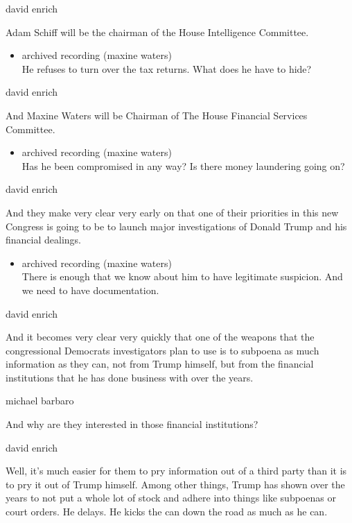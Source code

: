 david enrich

Adam Schiff will be the chairman of the House Intelligence Committee.

\begin{itemize}
\tightlist
\item
  archived recording (maxine waters)\\
  He refuses to turn over the tax returns. What does he have to hide?
\end{itemize}

david enrich

And Maxine Waters will be Chairman of The House Financial Services
Committee.

\begin{itemize}
\tightlist
\item
  archived recording (maxine waters)\\
  Has he been compromised in any way? Is there money laundering going
  on?
\end{itemize}

david enrich

And they make very clear very early on that one of their priorities in
this new Congress is going to be to launch major investigations of
Donald Trump and his financial dealings.

\begin{itemize}
\tightlist
\item
  archived recording (maxine waters)\\
  There is enough that we know about him to have legitimate suspicion.
  And we need to have documentation.
\end{itemize}

david enrich

And it becomes very clear very quickly that one of the weapons that the
congressional Democrats investigators plan to use is to subpoena as much
information as they can, not from Trump himself, but from the financial
institutions that he has done business with over the years.

michael barbaro

And why are they interested in those financial institutions?

david enrich

Well, it's much easier for them to pry information out of a third party
than it is to pry it out of Trump himself. Among other things, Trump has
shown over the years to not put a whole lot of stock and adhere into
things like subpoenas or court orders. He delays. He kicks the can down
the road as much as he can.

